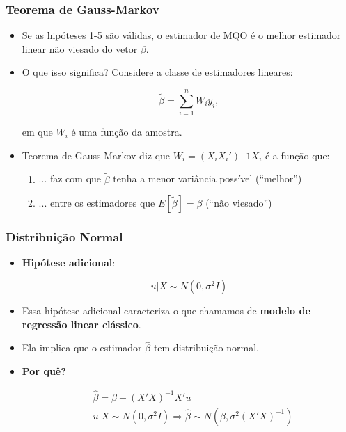 \documentclass[10pt,slides,xcolor=pdftex,dvipsnames,table]{beamer}
\begin{document}
\begin{frame}[fragile]
	\frametitle{Teorema de Gauss-Markov}

\begin{itemize}\itemsep1.2em

\item Se as hipóteses 1-5 são válidas, o estimador de MQO é o melhor estimador linear não viesado do vetor $\beta$.

\item O que isso significa? Considere a classe de estimadores lineares:

$$ \widetilde{\beta} = \sum_{i=1}^n W_i y_i, $$

em que $W_i$ é uma função da amostra.

\item Teorema de Gauss-Markov diz que $W_i = (X_i X_i')^-1 X_i$ é a função que:
\begin{enumerate}
\item ... faz com que $\widetilde{\beta}$ tenha a menor variância possível (``melhor'')
\item ... entre os estimadores  que $E[\widetilde{\beta}] = \beta$ (``não viesado'')   
\end{enumerate}      

\end{itemize}

\end{frame}


\begin{frame}[fragile]
	\frametitle{Distribuição Normal}

\begin{itemize}\itemsep1.2em

\item \textbf{Hipótese adicional}:

$$u | X \sim N(0, \sigma^2 I)$$     

\item Essa hipótese adicional caracteriza o que chamamos de \textbf{modelo de regressão linear clássico}.

\item Ela implica que o estimador $\widehat{\beta}$ tem distribuição normal.

\item \textbf{Por quê?} 

\begin{align*}
& \widehat{\beta} = \beta + (X'X)^{-1} X'u \\
& u | X \sim N(0, \sigma^2 I) \Longrightarrow \widehat{\beta} \sim N(\beta, \sigma^2 (X'X)^{-1})
\end{align*}

\end{itemize}

\end{frame}

\end{document}
